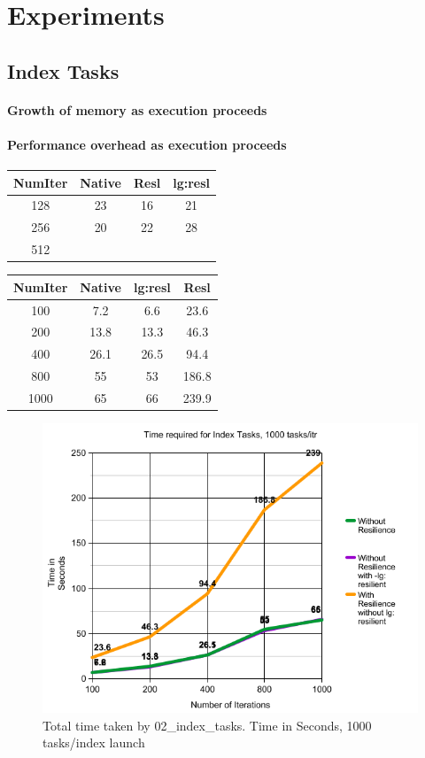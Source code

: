 
\section{Experiments}

\subsection{Index Tasks}

\paragraph{Growth of memory as execution proceeds}
\paragraph{Performance overhead as execution proceeds}


\begin{center}
 \begin{tabular}{||c | c | c | c||} 
 \hline
 NumIter& Native & Resl & lg:resl \\ [0.25ex] 
 \hline\hline
128 & 23 & 16 & 21\\ 
 \hline
256 & 20 & 22 & 28\\ 
 \hline
512 & \\ [1ex] 
 \hline
\end{tabular}
\end{center}




\begin{center}
 \begin{tabular}{||c | c | c | c||} 
 \hline
 NumIter& Native & lg:resl & Resl \\ [0.25ex] 
 \hline\hline
100 &  7.2 & 6.6 & 23.6\\ 
 \hline
200 &  13.8 & 13.3 & 46.3\\ 
 \hline
400 &  26.1 & 26.5 & 94.4\\ 
 \hline
800 &  55 & 53 & 186.8\\ 
 \hline
1000 &  65 & 66 & 239.9\\ [1ex] 
 \hline
\end{tabular}
\end{center}

\begin{figure}
\includegraphics[width=.45\textwidth]{images/index_tasks_time.png}
\caption{Total time taken by 02\_index\_tasks. Time in Seconds, 1000 tasks/index launch }
\end{figure}

